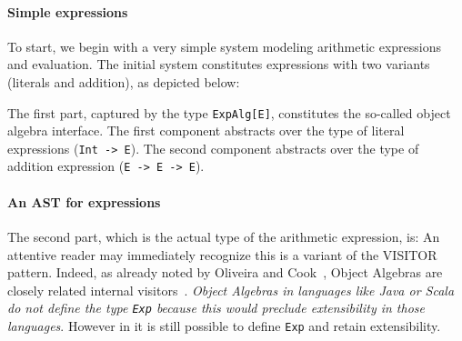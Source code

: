 \begin{comment}
\end{itemize}

Various solutions to the Expression Problem~\cite{wadler1998expression} in the
literature~\cite{finally-tagless,oliveira09modular,DelawareOS13,oliveira2012extensibility,
  swierstra:la-carte} are closely related to type-theoretic encodings of
datatypes. Indeed, variants of the same idea keep appearing in different
programming languages, because the encoding of the idea needs to exploit the
particular features of the programming language (or theorem prover).
Unfortunately language-specific constructs obscure the key ideas behind those
solutions. In this section we presents \name's solution to the Expression
Problem that intends to capture the key ideas of various solutions in the
literature.

\subsection{Extensibility and Subtyping}
\label{sec:extensibility}
\end{comment}

\paragraph{Simple expressions}
To start, we begin with a very simple system modeling arithmetic expressions and
evaluation. The initial system constitutes expressions with two variants
(literals and addition), as depicted below:

The first part, captured by the type \lstinline{ExpAlg[E]}, constitutes the
so-called object algebra interface. The first component abstracts over the type
of literal expressions (\lstinline{Int -> E}). The second component abstracts
over the type of addition expression (\lstinline{E -> E -> E}).

\paragraph{An AST for expressions}
The second part, which is the actual type of the arithmetic expression, is:
An attentive reader may immediately recognize this is a variant of the VISITOR
pattern. Indeed, as already noted by Oliveira and Cook~\cite{}, Object
Algebras are closely related internal visitors~\cite{}. \emph{Object
Algebras in languages like Java or Scala do not define the type
\lstinline{Exp} because this would preclude extensibility in those
languages}. However in \name it is still possible to define
\lstinline{Exp} and retain extensibility.

